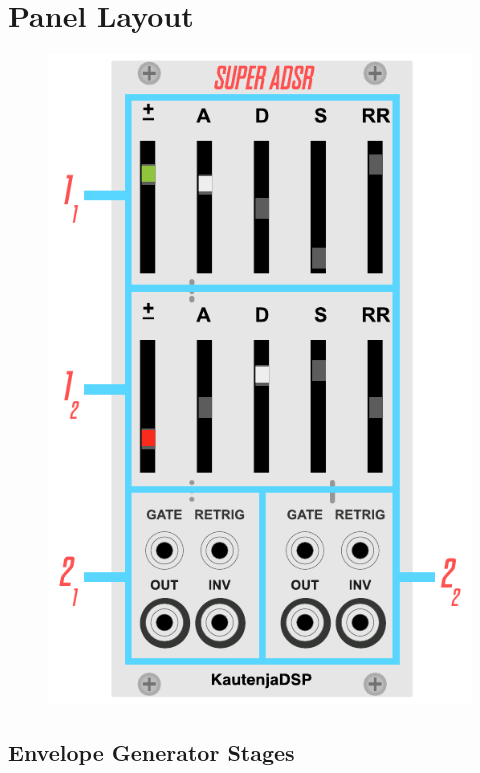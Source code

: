 \documentclass[12pt,letter]{article}
\begin{document}

\clearpage
\section{Panel Layout}

\begin{figure}[!htp]
\centering
\includegraphics{img/Interface}
\end{figure}

\subsection{Envelope Generator Stages}
\end{document}
